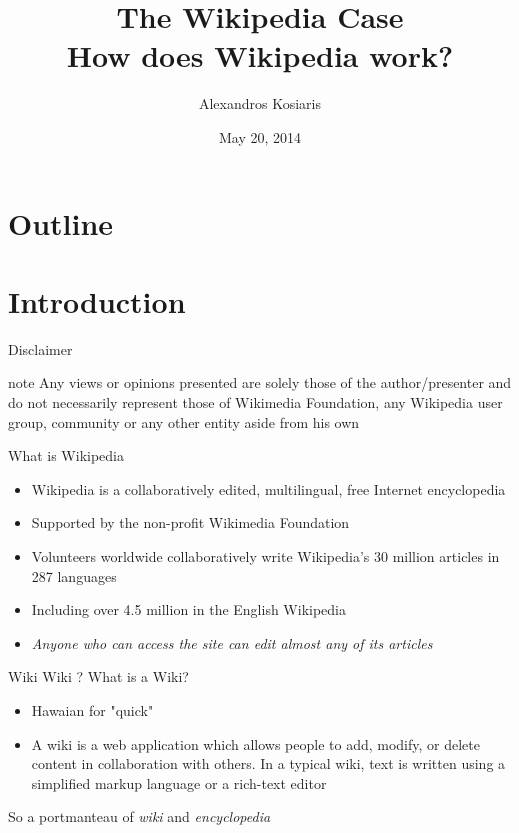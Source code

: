 \documentclass{beamer}
\title[The Wikipedia Case]{The Wikipedia Case\\How does Wikipedia work?}
\author{Alexandros Kosiaris}
\date{May 20, 2014}
\begin{document}
\begin{frame}
\titlepage
\end{frame}


\section{Outline}
\frame{\tableofcontents}

\section{Introduction}
\begin{frame}{Disclaimer}
	\begin{beamercolorbox}[center,shadow=true,rounded=true,]{note}
	Any views or opinions presented are solely those of the author/presenter and do not necessarily
	represent those of Wikimedia Foundation, any Wikipedia user group, community or any other entity
	aside from his own
	\end{beamercolorbox}
\end{frame}
\begin{frame}{What is Wikipedia}
	\begin{itemize}
		\pause \item Wikipedia is a collaboratively edited, multilingual, free Internet encyclopedia
		\pause \item Supported by the non-profit Wikimedia Foundation
		\pause \item Volunteers worldwide collaboratively write Wikipedia's 30 million articles in 287 languages
		\pause \item Including over 4.5 million in the English Wikipedia
		\pause \item \emph{Anyone who can access the site can edit almost any of its articles}
	\end{itemize}
\end{frame}
\begin{frame}{Wiki}
	Wiki ? What is a Wiki?
	\begin{itemize}
		\pause \item Hawaian for "quick"
		\pause \item A wiki is a web application which allows people to add, modify, or delete content in collaboration
			with others. In a typical wiki, text is written using a simplified markup language or a rich-text editor
	\end{itemize}
	\pause So a portmanteau of \emph{wiki} and \emph{encyclopedia}
\end{frame}
\end{document}
